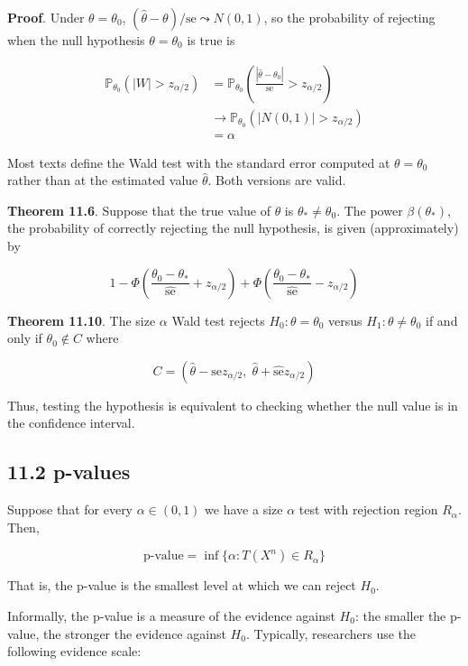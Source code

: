 \textbf{Proof}. Under \(\theta = \theta_{0}\),
\((\hat{\theta} - \theta) / \text{se} \leadsto N(0, 1)\), so the
probability of rejecting when the null hypothesis \(\theta = \theta_{0}\)
is true is

\begin{align*}
\mathbb{P}_{\theta_{0}}(|W| > z_{\alpha / 2}) &= \mathbb{P}_{\theta_{0}} \left(\frac{|\hat{\theta} - \theta_{0}|}{\text{se}} > z_{\alpha/2} \right) \\
& \rightarrow \mathbb{P}_{\theta_{0}}(| N(0, 1) | > z_{\alpha/2}) \\
& = \alpha
\end{align*}

Most texts define the Wald test with the standard error computed at
\(\theta = \theta_{0}\) rather than at the estimated value
\(\hat{\theta}\). Both versions are valid.

\textbf{Theorem 11.6}. Suppose that the true value of \(\theta\) is
\(\theta_* \neq \theta_{0}\). The power \(\beta(\theta_*)\), the
probability of correctly rejecting the null hypothesis, is given
(approximately) by

\[ 1 - \Phi \left(\frac{\theta_{0} - \theta_*}{\hat{\text{se}}} + z_{\alpha/2} \right) + \Phi \left(\frac{\theta_{0} - \theta_*}{\hat{\text{se}}} - z_{\alpha/2} \right) \]

\textbf{Theorem 11.10}. The size \(\alpha\) Wald test rejects
\(H_{0}: \theta = \theta_{0}\) versus \(H_{1}: \theta \neq \theta_{0}\) if and
only if \(\theta_{0} \notin C\) where

\[ C = \left(\hat{\theta} - \hat{\text{se}} z_{\alpha/2}, \; \hat{\theta} + \hat{\text{se}} z_{\alpha / 2} \right) \]

Thus, testing the hypothesis is equivalent to checking whether the null
value is in the confidence interval.

\subsection*{11.2 p-values}\label{p-values}

Suppose that for every \(\alpha \in (0, 1)\) we have a size \(\alpha\)
test with rejection region \(R_\alpha\). Then,

\[ \text{p-value} = \inf \Big\{ \alpha : T(X^{n}) \in R_\alpha \Big\} \]

That is, the p-value is the smallest level at which we can reject
\(H_{0}\).

Informally, the p-value is a measure of the evidence against \(H_{0}\):
the smaller the p-value, the stronger the evidence against \(H_{0}\).
Typically, researchers use the following evidence scale:

